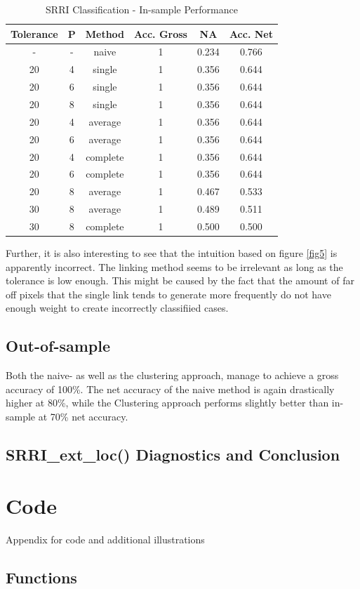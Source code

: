 \documentclass[aodsor,preprint]{imsart}
\numberwithin{equation}{section}
\theoremstyle{plain}
\begin{document}
\begin{table}[H]
	\begin{center}
		\caption{SRRI Classification - In-sample Performance}
		\begin{tabular}{|c|c|c|c|c|c|}
			\hline
			Tolerance & P & Method & Acc. Gross & NA & Acc. Net\\
			\hline
			- & - & naive & 1 & 0.234 & 0.766\\
			\hline
			 20 & 4 & single & 1 & 0.356 & 0.644\\
			\hline
			 20 & 6 & single & 1 & 0.356 & 0.644 \\
			\hline
			 20 & 8 & single & 1 & 0.356 & 0.644 \\
			\hline
			 20 & 4 & average & 1 & 0.356 & 0.644\\
			\hline
			 20 & 6 & average & 1 & 0.356 & 0.644\\
			\hline
			 20 & 4 & complete & 1 & 0.356 & 0.644\\
			\hline
			 20 & 6 & complete & 1 & 0.356 & 0.644\\
			\hline
			 20 & 8 & average & 1 & 0.467 & 0.533\\
			\hline
			 30 & 8 & average & 1 & 0.489 & 0.511\\
			\hline
			 30 & 8 & complete & 1 & 0.500 & 0.500\\
			\hline
		\end{tabular}
	\end{center}
\end{table}

Further, it is also interesting to see that the intuition based on figure \ref{fig5} is apparently incorrect. The linking method seems to be irrelevant as long as the tolerance is low enough. This might be caused by the fact that the amount of far off pixels that the single link tends to generate more frequently do not have enough weight to create incorrectly classifiied cases.

\subsection{Out-of-sample}
Both the naive- as well as the clustering approach, manage to achieve a gross accuracy of 100\%. The net accuracy of the naive method is again drastically higher at 80\%, while the Clustering approach performs slightly better than in-sample at 70\% net accuracy.

\subsection{SRRI\_ext\_loc() Diagnostics and Conclusion}

\newpage

\appendix


\section{Code}
\label{sec:app}

Appendix for code and additional illustrations

\subsection{Functions}






\newpage
\printbibliography
\end{document}
